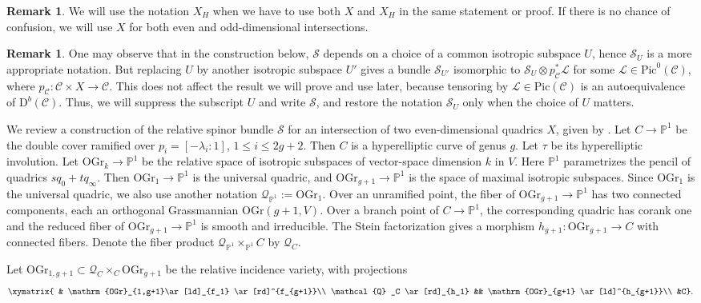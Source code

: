 \documentclass[12pt, letterpaper]{amsart}
\theoremstyle{definition}
\newtheorem{remark}[theorem]{Remark}
\newcommand{\PP}{\mathbb{P} }
\newcommand{\cC}{\mathcal{C} }
\newcommand{\cL}{\mathcal{L} }
\newcommand{\cQ}{\mathcal{Q} }
\newcommand{\cS}{\mathcal{S} }
\newcommand{\rD}{\mathrm{D} }
\def\OGr{\mathrm{OGr}}
\def\Pic{\mathrm{Pic} }
\begin{document}
\begin{remark}
We will use the notation \(X_H\) when we have to use both \(X\) and \(X_H\) in the same statement or proof. If there is no chance of confusion, we will use \(X\) for both even and odd-dimensional intersections.
\end{remark}

\begin{remark}
One may observe that in the construction below, \(\cS\) depends on a choice of a common isotropic subspace \(U\), hence \(\cS_U\) is a more appropriate notation. But replacing \(U\) by another isotropic subspace \(U'\) gives a bundle \(\cS_{U'}\) isomorphic to \(\cS_U \otimes p_{\cC}^*\cL\) for some \(\cL \in \Pic^0(\cC)\), where \(p_{\cC} : \cC \times X \to \cC\). This does not affect the result we will prove and use later, because tensoring by \(\cL \in \Pic(\cC)\) is an autoequivalence of \(\rD^b(\cC)\). Thus, we will suppress the subscript \(U\) and write \(\cS\), and restore the notation \(\cS_U\) only when the choice of \(U\) matters.
\end{remark}

We review a construction of the relative spinor bundle \(\cS\) for an intersection of two even-dimensional quadrics \(X\), given by \cite{BO95}. Let \(C\to\PP^1\) be the double cover ramified over \(p_i=[-\lambda_i:1]\), \(1\le i\le 2g+2\). Then \(C\) is a hyperelliptic curve of genus \(g\). Let \(\tau\) be its hyperelliptic involution. Let \(\OGr_k \to \PP^1\) be the relative space of isotropic subspaces of vector-space dimension \(k\) in \(V\). Here \(\PP^1\) parametrizes the pencil of quadrics \(sq_0 + t q_\infty\). Then \(\OGr_1 \to \PP^1\) is the universal quadric, and \(\OGr_{g+1} \to \PP^1\) is the space of maximal isotropic subspaces. Since \(\OGr_1\) is the universal quadric, we also use another notation \(\cQ_{\PP^1} := \OGr_1\). Over an unramified point, the fiber of \(\OGr_{g+1} \to \PP^1\) has two connected components, each an orthogonal Grassmannian \(\OGr(g+1, V)\). Over a branch point of \(C \to \PP^1\), the corresponding quadric has corank one and the reduced fiber of \(\OGr_{g+1} \to \PP^1\) is smooth and irreducible. The Stein factorization gives a morphism \(h_{g+1} : \OGr_{g+1} \to C\) with connected fibers. Denote the fiber product \(\cQ_{\PP^1} \times_{\PP^1} C\) by \(\cQ_C\).

Let \(\OGr_{1, g+1} \subset \cQ_C \times_C \OGr_{g+1}\) be the relative incidence variety, with projections
\begin{equation}\label{eqn:projections}
\xymatrix{ & \OGr_{1,g+1}\ar[ld]_{f_1} \ar[rd]^{f_{g+1}}\\ \cQ_C \ar[rd]_{h_1} && \OGr_{g+1} \ar[ld]^{h_{g+1}}\\ &C}.
\end{equation}
\end{document}
